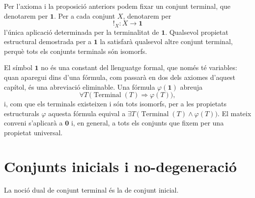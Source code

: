 \begin{notacio}\label{not:terminal-escollit}
Per l'axioma i la proposició anteriors podem fixar un conjunt terminal, que denotarem per \(\mathbf1\). Per a cada conjunt \(X\), denotarem per
\[
{!}_X:X\to\mathbf1
\]
l'única aplicació determinada per la terminalitat de \(\mathbf1\). Qualsevol propietat estructural demostrada per a \(\mathbf1\)
la satisfarà qualsevol altre conjunt terminal, perquè tots
els conjunts terminals són isomorfs.

El símbol \(\mathbf1\) no és una constant del llenguatge formal, que només té variables: quan aparegui dins d'una fórmula, com passarà en dos dels axiomes d'aquest capítol, és una abreviació eliminable. Una fórmula \(\varphi(\mathbf1)\) abreuja
\[
\forall T\,\bigl(\operatorname{Terminal}(T)\Rightarrow\varphi(T)\bigr),
\]
i, com que els terminals existeixen i són tots isomorfs, per a les propietats estructurals \(\varphi\) aquesta fórmula equival a \(\exists T\,\bigl(\operatorname{Terminal}(T)\land\varphi(T)\bigr)\). El mateix conveni s'aplicarà a \(\mathbf0\) i, en general, a tots els conjunts que fixem per una propietat universal.
\end{notacio}

\section{Conjunts inicials i no-degeneració}\label{sec:inicials}

La noció dual de conjunt terminal és la de conjunt inicial.

